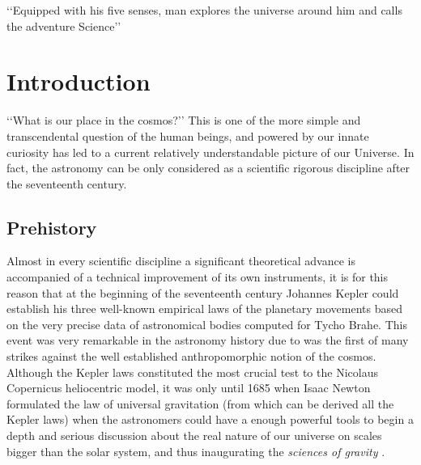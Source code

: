 

\begin{savequote}[50mm]
‘‘Equipped with his five senses, man explores the universe around him and 
calls the adventure Science’’
\end{savequote}


\chapter{Introduction}
\label{cha:Introduction}

 


‘‘What is our place in the cosmos?’’ This is one of the more simple and 
trans\-cendental question of the human beings, and powered by our innate 
curiosity has led to a current relatively understandable picture of our 
Universe. In fact, the astronomy can be only considered as a scientific 
rigorous discipline after the seventeenth century.







\section{Prehistory}
\label{sec:Prehistory}


Almost in every scientific discipline a significant theoretical advance is 
accompanied of a technical improvement of its own instruments, it is for 
this reason that at the beginning of the seventeenth century Johannes Kepler 
could establish his three well-known empirical laws of the planetary 
movements based on the very precise data of astronomical bodies computed 
for Tycho Brahe. This event was very remarkable in the astronomy history 
due to was the first of many strikes against the well established 
anthropomorphic notion of the cosmos. Although the Kepler laws constituted 
the most crucial test to the Nicolaus Copernicus heliocentric model, it was 
only until 1685 when Isaac Newton formulated the law of universal gravitation 
(from which can be derived all the Kepler laws) when the astronomers could 
have a enough powerful tools to begin a depth and serious discussion about 
the real nature of our universe on scales bigger than the solar system, and 
thus inaugurating the \textit{sciences of gravity} \cite{longair2008}.



